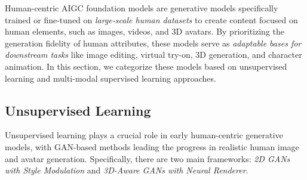 Human-centric AIGC foundation models are generative models specifically trained or fine-tuned on \textit{large-scale human datasets} to create content focused on human elements, such as images, videos, and 3D avatars. By prioritizing the generation fidelity of human attributes, these models serve as \textit{adaptable bases for downstream tasks} like 
image editing, virtual try-on, 3D generation, and character animation. 
In this section, we categorize these models based on unsupervised learning and multi-modal supervised learning approaches.

\subsection{Unsupervised Learning}

Unsupervised learning plays a crucial role in early human-centric generative models, with GAN-based methods leading the progress in realistic human image and avatar generation. Specifically, there are two main frameworks: \textit{2D GANs with Style Modulation} and \textit{3D-Aware GANs with Neural Renderer}.



